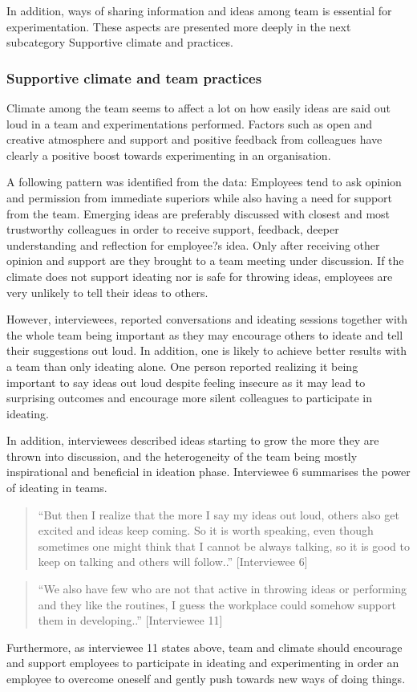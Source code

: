 In addition, ways of sharing information and ideas among team is essential for experimentation. These aspects are presented more deeply in the next subcategory Supportive climate and practices. 


\subsubsection{Supportive climate and team practices}
Climate among the team seems to affect a lot on how easily ideas are said out loud in a team and experimentations performed. Factors such as open and creative atmosphere and support and positive feedback from colleagues have clearly a positive boost towards experimenting in an organisation.

A following pattern was identified from the data: Employees tend to ask opinion and permission from immediate superiors while also having a need for support from the team. Emerging ideas are preferably discussed with closest and most trustworthy colleagues in order to receive support, feedback, deeper understanding and reflection for employee?s idea. Only after receiving other opinion and support are they brought to a team meeting under discussion. If the climate does not support ideating nor is safe for throwing ideas, employees are very unlikely to tell their ideas to others. 

However, interviewees, reported conversations and ideating sessions together with the whole team being important as they may encourage others to ideate and tell their suggestions out loud. In addition, one is likely to achieve better results with a team than only ideating alone. One person reported realizing it being important to say ideas out loud despite feeling insecure as it may lead to surprising outcomes and encourage more silent colleagues to participate in ideating. 

In addition, interviewees described ideas starting to grow the more they are thrown into discussion, and the heterogeneity of the team being mostly inspirational and beneficial in ideation phase. Interviewee 6 summarises the power of ideating in teams. 
\begin{quote}
``But then I realize that the more I say my ideas out loud, others also get excited and ideas keep coming. So it is worth speaking, even though sometimes one might think that I cannot be always talking, so it is good to keep on talking and others will follow..'' [Interviewee 6]
\end{quote}
\begin{quote}
``We also have few who are not that active in throwing ideas or performing and they like the routines, I guess the workplace could somehow support them in developing..'' [Interviewee 11]
\end{quote}
Furthermore, as interviewee 11 states above, team and climate should encourage and support employees to participate in ideating and experimenting in order an employee to overcome oneself and gently push towards new ways of doing things. 

